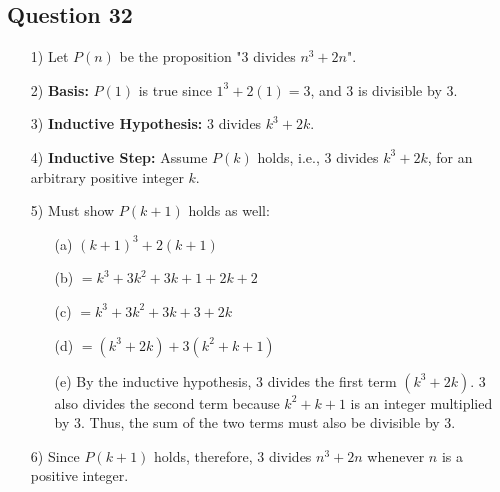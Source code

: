 \documentclass{article}
\begin{document}
\subsection*{Question 32}
\begin{itemize}
    \item[1)] Let \( P(n) \) be the proposition "\( 3 \) divides \( n^3 + 2n \)".
    \item[2)] \textbf{Basis:} \( P(1) \) is true since \( 1^3 + 2(1) = 3 \), and \( 3 \) is divisible by \( 3 \).
    \item[3)] \textbf{Inductive Hypothesis:} \( 3 \) divides \( k^3 + 2k \).
    \item[4)] \textbf{Inductive Step:} Assume \( P(k) \) holds, i.e., \( 3 \) divides \( k^3 + 2k \), for an arbitrary positive integer \( k \).
    \item[5)] Must show \( P(k + 1) \) holds as well:
    \begin{enumerate}
        \item[(a)] \( (k + 1)^3 + 2(k + 1) \)
        \item[(b)] \( = k^3 + 3k^2 + 3k + 1 + 2k + 2 \)
        \item[(c)] \( = k^3 + 3k^2 + 3k + 3 + 2k \)
        \item[(d)] \( = (k^3 + 2k) + 3(k^2 + k + 1) \)
        \item[(e)] By the inductive hypothesis, \( 3 \) divides the first term \( (k^3 + 2k) \). \( 3 \) also divides the second term because \( k^2 + k + 1 \) is an integer multiplied by \( 3 \). Thus, the sum of the two terms must also be divisible by \( 3 \).
    \end{enumerate}
    \item[6)] Since \( P(k + 1) \) holds, therefore, \( 3 \) divides \( n^3 + 2n \) whenever \( n \) is a positive integer.
\end{itemize}
\end{document}
